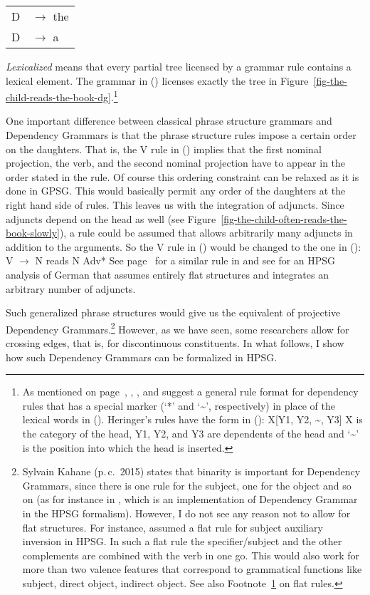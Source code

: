 \begin{tabular}[t]{@{}l@{ }l}
{D}  & {$\to$ the}\\
{D}  & {$\to$ a}\\
\end{tabular}
\z
\emph{Lexicalized}  means that every partial tree licensed by a grammar rule contains a lexical element.
The grammar in () licenses exactly the tree in
Figure~\ref{fig-the-child-reads-the-book-dg}.\footnote{\label{fn-flat-dg-rules}%
As mentioned on page~\pageref{page-rule-format-dg}, \citet[]{Gaifman65a}, \citet[]{Hays64a-u}, \citet[]{Baumgaertner70a} and \citet[]{Heringer96a-u} suggest a
general rule format for dependency rules that has a special marker (`*' and `\textasciitilde', respectively) in place of the lexical words in (). Heringer's rules have the
form in ():
\ea
X[Y1, Y2, \textasciitilde, Y3]
\z
X is the category of the head, Y1, Y2, and Y3 are dependents of the head and `\textasciitilde' is the position into
which the head is inserted.
}

One important difference between classical phrase structure grammars and Dependency Grammars is that the
phrase structure rules impose a certain order on the daughters. That is, the V rule in ()
implies that the first nominal projection, the verb, and the second nominal projection have to
appear in the order stated in the rule. Of course this ordering constraint can be relaxed as it is
done in GPSG. This would basically permit any order of the daughters at the right hand side of
rules.
This leaves us with the integration of adjuncts. Since adjuncts depend on the head as well (see
Figure~\vref{fig-the-child-often-reads-the-book-slowly}), a rule could be assumed that allows
arbitrarily many adjuncts in addition to the arguments. So the V rule in () would be changed
to the one in ():
\ea
V $\to$ N reads N Adv*
\z 
See page~\pageref{adv-metarule} for a similar rule in \gpsg and see \citet{Kasper94a} for an HPSG
analysis of German that assumes entirely flat structures and integrates an arbitrary number of adjuncts.


Such generalized phrase structures would give us the equivalent of projective Dependency
Grammars.\footnote{\label{fn-dg-binary-branching}%
Sylvain Kahane (p.\,c.\, 2015) states that binarity is important for Dependency Grammars, since
there is one rule for the subject, one for the object and so on (as for instance in
\citealp{Kahane2009a}, which is an implementation of Dependency Grammar in the HPSG formalism). However, I do not see any reason
not to allow for flat structures. For instance, \citet[]{GSag2000a-u} assumed a flat rule for subject
auxiliary inversion in HPSG. In such a flat rule the specifier/subject and the other complements are
combined with the verb in one go. This would also work for more than two valence features that correspond
to grammatical functions like subject, direct object, indirect object. See also
Footnote~\ref{fn-flat-dg-rules} on flat rules.
} However, as we have seen, some researchers allow for crossing edges, that is, for
discontinuous constituents. In what follows, I show how such Dependency Grammars can be formalized in
HPSG.

